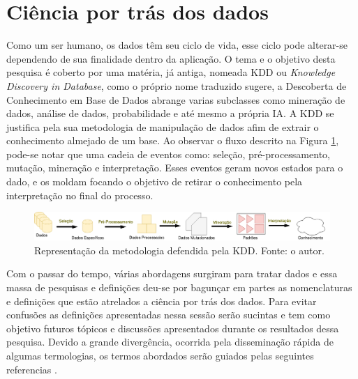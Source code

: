 \section{Ciência por trás dos dados}
Como um ser humano, os dados têm seu ciclo de vida, esse ciclo pode alterar-se dependendo de sua finalidade dentro da aplicação. O tema e o objetivo desta pesquisa é coberto por uma matéria, já antiga, nomeada KDD ou \textit{Knowledge Discovery in Database}, como o próprio nome traduzido sugere, a Descoberta de Conhecimento em Base de Dados abrange varias subclasses como mineração de dados, análise de dados, probabilidade e até mesmo a própria IA. A KDD se justifica pela sua metodologia de manipulação de dados afim de extrair o conhecimento almejado de um base. Ao observar o fluxo descrito na Figura \ref{fig:kdd}, pode-se notar que uma cadeia de eventos como: seleção, pré-processamento, mutação, mineração e interpretação. Esses eventos geram novos estados para o dado, e os moldam focando o objetivo de retirar o conhecimento pela interpretação no final do processo.

\begin{figure}
    \centering
    \includegraphics[width=.8\textwidth]{imagens/kdd.png}
    \caption{Representação da metodologia defendida pela KDD. Fonte: o autor.}
    \label{fig:kdd}
\end{figure}

Com o passar do tempo, várias abordagens surgiram para tratar dados e essa massa de pesquisas e definições deu-se por bagunçar em partes as nomenclaturas e definições que estão atrelados a ciência por trás dos dados. Para evitar confusões as definições apresentadas nessa sessão serão sucintas e tem como objetivo futuros tópicos e discussões apresentados durante os resultados dessa pesquisa. Devido a grande divergência, ocorrida pela disseminação rápida de algumas termologias, os termos abordados serão guiados pelas seguintes referencias \cite{laender2002brief, fayyad1996kdd, hand2007principles}.




